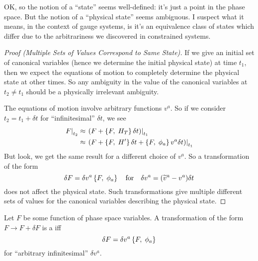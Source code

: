 \begin{remark}
OK, so the notion of a ``state'' seems well-defined: it's just a point
in the phase space. But the notion of a ``physical state'' seems
ambiguous. I suspect what it means, in the context of gauge systems, is
it's an equivalence class of states which differ due to the
arbitrariness we discovered in constrained systems.
\end{remark}

\begin{proof}[Proof (Multiple Sets of Values Correspond to Same State)]
If we give an initial set of canonical variables (hence we determine the
initial physical state) at time $t_{1}$, then we expect the equations of
motion to completely determine the physical state at other times. So any
ambiguity in the value of the canonical variables at $t_{2}\neq t_{1}$
should be a physically irrelevant ambiguity.

The equations of motion 
involve arbitrary functions $v^{a}$. So if we consider
$t_{2}=t_{1}+\delta t$ for ``infinitesimal'' $\delta t$, we see
\begin{equation}
\begin{split}
\left.F\right|_{t_{2}}
&\approx\left.\left(F + \left\{F,\;H_{T}\right\}\delta t\right)\right|_{t_{1}}\\
&\approx\left.\left(F + \left\{F,\;H'\right\}\delta t + \left\{F,\;\phi_{a}\right\}v^{a}\delta{t}\right)\right|_{t_{1}}
\end{split}
\end{equation}
But look, we get the same result for a different choice of $v^{a}$. So a
transformation of the form
\begin{equation}
\delta F = \delta v^{a}\left\{F,\;\phi_{a}\right\}\quad\mbox{for}\quad
\delta v^{a} = (\widetilde{v}^{a}-v^{a})\delta t
\end{equation}
does not affect the physical state. Such transformations give multiple
different sets of values for the canonical variables describing the
physical state.
\end{proof}

\label{n:constrained:attempted-defn-of-gauge-transformation}
Let $F$ be some function of phase space variables. A transformation of
the form $F\to F + \delta F$ is a  iff
\begin{equation}
\delta F = \delta v^{a}\left\{F,\;\phi_{a}\right\}
\end{equation}
for ``arbitrary infinitesimal'' $\delta v^{a}$.

